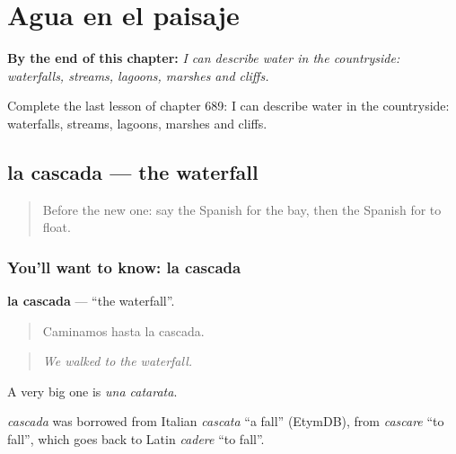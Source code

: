 
\chapter{Agua en el paisaje}
\label{ch:es-agua-en-el-paisaje}

\begin{chapteropening}
\textbf{By the end of this chapter:} \emph{I can describe water in the countryside: waterfalls, streams, lagoons, marshes and cliffs.}

Complete the last lesson of chapter 689: I can describe water in the countryside: waterfalls, streams, lagoons, marshes and cliffs.
\end{chapteropening}

\section[la cascada]{la cascada — the waterfall}

\label{lesson:ES-C689-cascada}



\begin{quote}
Before the new one: say the Spanish for the bay, then the Spanish for to float.
\end{quote}

\subsection*{You'll want to know: la cascada}
\textbf{la cascada} — \textquotedblleft{}the waterfall\textquotedblright{}.

\begin{quote}
Caminamos hasta la cascada.
\end{quote}

\begin{quote}
\emph{We walked to the waterfall.}
\end{quote}

A very big one is \emph{una catarata}.

\begin{cousinweb}
\emph{cascada} was borrowed from Italian \emph{cascata} \textquotedblleft{}a fall\textquotedblright{} (EtymDB), from \emph{cascare} \textquotedblleft{}to fall\textquotedblright{}, which goes back to Latin \emph{cadere} \textquotedblleft{}to fall\textquotedblright{}.
\end{cousinweb}

